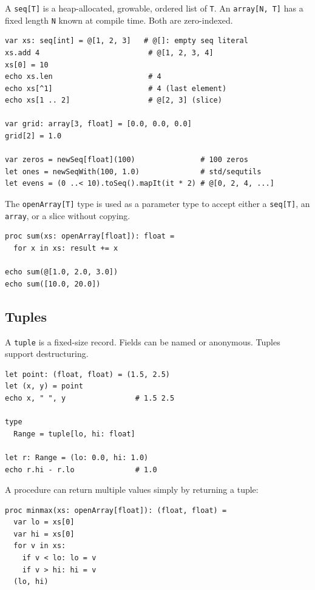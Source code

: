 \documentclass[justified, sixbynine]{tufte-book}
\def\ft{\small\tt}
\theoremstyle{plain}%
\newtheorem * {corollary}{Corollary}
\theoremstyle{definition}
\theoremstyle{remark}
\newtheorem * {remark}{Remark}
\newtheorem * {note}{Note}
\begin{document}
\begin{fullwidth}

A {\ft seq[T]} is a heap-allocated, growable, ordered list of {\ft T}. An {\ft array[N, T]} has a fixed length {\ft N} known at compile time. Both are zero-indexed.

\begin{lstlisting}
var xs: seq[int] = @[1, 2, 3]   # @[]: empty seq literal
xs.add 4                         # @[1, 2, 3, 4]
xs[0] = 10
echo xs.len                      # 4
echo xs[^1]                      # 4 (last element)
echo xs[1 .. 2]                  # @[2, 3] (slice)

var grid: array[3, float] = [0.0, 0.0, 0.0]
grid[2] = 1.0

var zeros = newSeq[float](100)               # 100 zeros
let ones = newSeqWith(100, 1.0)              # std/sequtils
let evens = (0 ..< 10).toSeq().mapIt(it * 2) # @[0, 2, 4, ...]
\end{lstlisting}

The {\ft openArray[T]} type is used as a parameter type to accept either a {\ft seq[T]}, an {\ft array}, or a slice without copying.

\begin{lstlisting}
proc sum(xs: openArray[float]): float =
  for x in xs: result += x

echo sum(@[1.0, 2.0, 3.0])
echo sum([10.0, 20.0])
\end{lstlisting}

\goodbreak\subsection{Tuples}


A {\ft tuple} is a fixed-size record. Fields can be named or anonymous. Tuples support destructuring.

\begin{lstlisting}
let point: (float, float) = (1.5, 2.5)
let (x, y) = point
echo x, " ", y                # 1.5 2.5

type
  Range = tuple[lo, hi: float]

let r: Range = (lo: 0.0, hi: 1.0)
echo r.hi - r.lo              # 1.0
\end{lstlisting}

A procedure can return multiple values simply by returning a tuple:

\begin{lstlisting}
proc minmax(xs: openArray[float]): (float, float) =
  var lo = xs[0]
  var hi = xs[0]
  for v in xs:
    if v < lo: lo = v
    if v > hi: hi = v
  (lo, hi)


\end{lstlisting}
\end{fullwidth}
\end{document}
